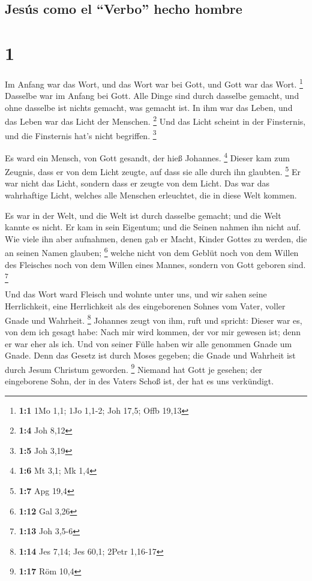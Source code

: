 \hypertarget{jesuxfas-como-el-verbo-hecho-hombre}{%
\subsection{Jesús como el ``Verbo'' hecho
hombre}\label{jesuxfas-como-el-verbo-hecho-hombre}}

\hypertarget{section}{%
\section{1}\label{section}}

 Im Anfang war das Wort, und das Wort war bei Gott, und
Gott war das Wort. \footnote{\textbf{1:1} 1Mo 1,1; 1Jo 1,1-2; Joh 17,5;
  Offb 19,13}  Dasselbe war im Anfang bei Gott.
 Alle Dinge sind durch dasselbe gemacht, und ohne dasselbe
ist nichts gemacht, was gemacht ist.  In ihm war das
Leben, und das Leben war das Licht der Menschen. \footnote{\textbf{1:4}
  Joh 8,12}  Und das Licht scheint in der Finsternis, und
die Finsternis hat's nicht begriffen. \footnote{\textbf{1:5} Joh 3,19}

 Es ward ein Mensch, von Gott gesandt, der hieß Johannes.
\footnote{\textbf{1:6} Mt 3,1; Mk 1,4}  Dieser kam zum
Zeugnis, dass er von dem Licht zeugte, auf dass sie alle durch ihn
glaubten. \footnote{\textbf{1:7} Apg 19,4}  Er war nicht
das Licht, sondern dass er zeugte von dem Licht.  Das war
das wahrhaftige Licht, welches alle Menschen erleuchtet, die in diese
Welt kommen.

 Es war in der Welt, und die Welt ist durch dasselbe
gemacht; und die Welt kannte es nicht.  Er kam in sein
Eigentum; und die Seinen nahmen ihn nicht auf.  Wie viele
ihn aber aufnahmen, denen gab er Macht, Kinder Gottes zu werden, die an
seinen Namen glauben; \footnote{\textbf{1:12} Gal 3,26} 
welche nicht von dem Geblüt noch von dem Willen des Fleisches noch von
dem Willen eines Mannes, sondern von Gott geboren sind. \footnote{\textbf{1:13}
  Joh 3,5-6}

 Und das Wort ward Fleisch und wohnte unter uns, und wir
sahen seine Herrlichkeit, eine Herrlichkeit als des eingeborenen Sohnes
vom Vater, voller Gnade und Wahrheit. \footnote{\textbf{1:14} Jes 7,14;
  Jes 60,1; 2Petr 1,16-17}  Johannes zeugt von ihm, ruft
und spricht: Dieser war es, von dem ich gesagt habe: Nach mir wird
kommen, der vor mir gewesen ist; denn er war eher als ich.
 Und von seiner Fülle haben wir alle genommen Gnade um
Gnade.  Denn das Gesetz ist durch Moses gegeben; die
Gnade und Wahrheit ist durch Jesum Christum geworden. \footnote{\textbf{1:17}
  Röm 10,4}  Niemand hat Gott je gesehen; der eingeborene
Sohn, der in des Vaters Schoß ist, der hat es uns verkündigt.

